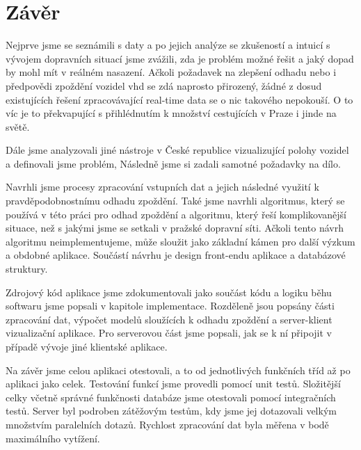 \chapter*{Závěr}


Nejprve jsme se seznámili s daty a po jejich analýze se zkušeností a intuicí s vývojem dopravních situací jsme zvážili, zda je problém možné řešit a jaký dopad by mohl mít v reálném nasazení. Ačkoli požadavek na zlepšení odhadu nebo i předpovědi zpoždění vozidel \gls{vhd} se zdá naprosto přirozený, žádné z dosud existujících řešení zpracovávající real-time data se o nic takového nepokouší. O to víc je to překvapující s přihlédnutím k množství cestujících v Praze i jinde na světě.


\bigbreak


Dále jsme analyzovali jiné nástroje v České republice vizualizující polohy vozidel a definovali jsme problém, Následně jsme si zadali samotné požadavky na dílo.

\bigbreak


Navrhli jsme procesy zpracování vstupních dat a jejich následné využití k pravděpodobnostnímu odhadu zpoždění. Také jsme navrhli algoritmus, který se používá v této práci pro odhad zpoždění a algoritmu, který řeší komplikovanější situace, než s jakými jsme se setkali v pražské dopravní síti. Ačkoli tento návrh algoritmu neimplementujeme, může sloužit jako základní kámen pro další výzkum a obdobné aplikace. Součástí návrhu je design front-endu aplikace a databázové struktury.


\bigbreak


Zdrojový kód aplikace jsme zdokumentovali jako součást kódu a logiku běhu softwaru jsme popsali v kapitole implementace. Rozděleně jsou popsány části zpracování dat, výpočet modelů sloužících k odhadu zpoždění a server-klient vizualizační aplikace. Pro serverovou část jsme popsali, jak se k ní připojit v případě vývoje jiné klientské aplikace.


\bigbreak


Na závěr jsme celou aplikaci otestovali, a to od jednotlivých funkčních tříd až po aplikaci jako celek. Testování funkcí jsme provedli pomocí unit testů. Složitější celky včetně správné funkčnosti databáze jsme otestovali pomocí integračních testů. Server byl podroben zátěžovým testům, kdy jsme jej dotazovali velkým množstvím paralelních dotazů. Rychlost zpracování dat byla měřena v bodě maximálního vytížení.


\bigbreak


